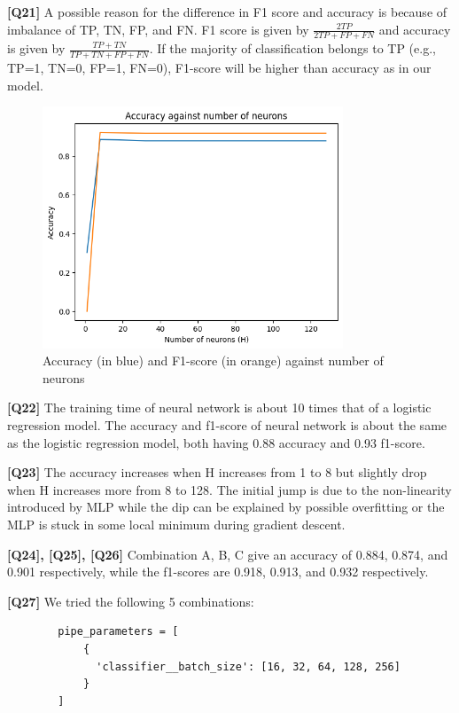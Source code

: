 \documentclass{article}
\begin{document}
\begin{description}
	\item \textbf{[Q21]} A possible reason for the difference in F1 score and accuracy is because of imbalance of TP, TN, FP, and FN. F1 score is given by $\frac{2TP}{2TP+FP+FN}$ and accuracy is given by $\frac{TP+TN}{TP+TN+FP+FN}$. If the majority of classification belongs to TP (e.g., TP=1, TN=0, FP=1, FN=0), F1-score will be higher than accuracy as in our model.
		\begin{figure}[H]
			\centering
			\includegraphics[width=0.8\textwidth]{figures/q21_accuracy.png}
			\caption{Accuracy (in blue) and F1-score (in orange) against number of neurons}
			\label{q20}
		\end{figure}
	\item \textbf{[Q22]} The training time of neural network is about 10 times that of a logistic regression model. The accuracy and f1-score of neural network is about the same as the logistic regression model, both having 0.88 accuracy and 0.93 f1-score.

	\item \textbf{[Q23]} The accuracy increases when H increases from 1 to 8 but slightly drop when H increases more from 8 to 128. The initial jump is due to the non-linearity introduced by MLP while the dip can be explained by possible overfitting or the MLP is stuck in some local minimum during gradient descent.

	\item \textbf{[Q24], [Q25], [Q26]} Combination A, B, C give an accuracy of 0.884, 0.874, and 0.901 respectively, while the f1-scores are 0.918, 0.913, and 0.932 respectively.

	\item \textbf{[Q27]} We tried the following 5 combinations:
		\begin{verbatim}
		pipe_parameters = [
			{
			  'classifier__batch_size': [16, 32, 64, 128, 256]
			}
		]	
		\end{verbatim}


\end{description}
\end{document}
